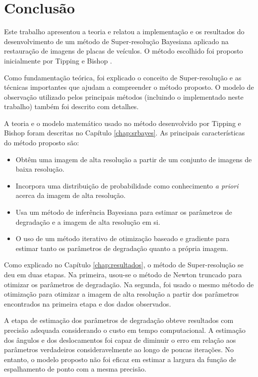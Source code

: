 \chapter{Conclusão}
\label{chap:conclusao}
Este trabalho apresentou a teoria e relatou a implementação e os resultados do desenvolvimento de um método de Super-resolução Bayesiana aplicado na restauração de imagens de placas de veículos.
O método escolhido foi proposto inicialmente por Tipping e Bishop \cite{tipping2003bayesian}. 


Como fundamentação teórica, foi explicado o conceito de Super-resolução e as técnicas importantes que ajudam a compreender o método proposto.
O modelo de observação utilizado pelos principais métodos (incluindo o implementado neste trabalho) também foi descrito com detalhes.

A teoria e o modelo matemático usado no método desenvolvido por Tipping e Bishop foram descritas no Capítulo \ref{chap:srbayes}.
As principais características do método proposto são:

\begin{itemize}
	\item Obtêm uma imagem de alta resolução a partir de um conjunto de imagens de baixa resolução.
	\item Incorpora uma distribuição de probabilidade como conhecimento \emph{a priori} acerca da imagem de alta resolução.
	\item Usa um método de inferência Bayesiana para estimar os parâmetros de degradação e a imagem de alta resolução em si.
	\item O uso de um método iterativo de otimização baseado e gradiente para estimar tanto os parâmetros de degradação quanto a própria imagem.

\end{itemize}

Como explicado no Capítulo \ref{chap:resultados}, o método de Super-resolução se deu em duas etapas.
Na primeira, usou-se o método de Newton truncado para otimizar os parâmetros de degradação.
Na segunda, foi usado o mesmo método de otimização para otimizar a imagem de alta resolução a partir dos parâmetros encontrados na primeira etapa e dos dados observados.

A etapa de estimação dos parâmetros de degradação obteve resultados com precisão adequada considerando o custo em tempo computacional.
A estimação dos ângulos e dos deslocamentos foi capaz de diminuir o erro em relação aos parâmetros verdadeiros consideravelmente ao longo de poucas iterações.
No entanto, o modelo proposto não foi eficaz em estimar a largura da função de espalhamento de ponto com a mesma precisão.

